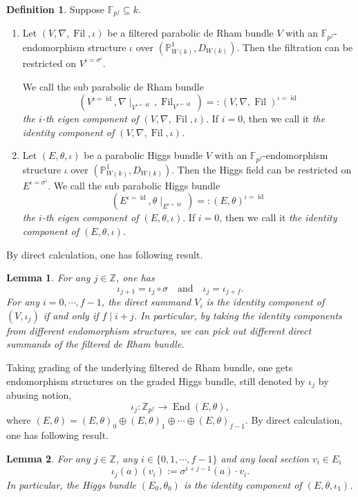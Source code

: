 \documentclass[12pt,twoside]{book}
\theoremstyle{plain}
\newtheorem{lemma}[lemma]{Lemma}
\theoremstyle{definition}
\newtheorem{definition}[definition]{Definition}
\theoremstyle{remark}
\newcommand{\bF}{{\mathbb F}}
\newcommand{\bP}{{\mathbb P}}
\newcommand{\bZ}{{\mathbb Z}}
\DeclareMathOperator\End{End}
\DeclareMathOperator\Fil{Fil}
\DeclareMathOperator\id{id}
\numberwithin{equation}{section}
\begin{document}
\begin{definition} Suppose $\bF_{p^f}\subseteq k$.
\begin{enumerate}
\item Let $(V,\nabla,\Fil,\iota)$ be a filtered parabolic de Rham bundle $V$ with an $\bF_{p^f}$-endomorphism structure $\iota$ over $(\bP^1_{W(k)},D_{W(k)})$. Then the filtration can be restricted on $V^{\iota=\sigma^i}$.

We call the sub parabolic de Rham bundle \[(V^{\iota=\id},\nabla\mid_{V^{\iota=\id}},\Fil_{V^{\iota=\id}}) =: (V,\nabla,\Fil)^{\iota=\id}\]
\emph{the $i$-th eigen component of $(V,\nabla,\Fil,\iota)$}. If $i=0$, then we call it \emph{the identity component of $(V,\nabla,\Fil,\iota)$.}
\item Let $(E,\theta,\iota)$ be a parabolic Higgs bundle $V$ with an $\bF_{p^f}$-endomorphism structure $\iota$ over $(\bP^1_{W(k)},D_{W(k)})$. Then the Higgs field can be restricted on $E^{\iota=\sigma^i}$.
We call the sub parabolic Higgs bundle \[(E^{\iota=\id},\theta\mid_{E^{\iota=\id}}) =: (E,\theta)^{\iota=\id}\]
\emph{the $i$-th eigen component of $(E,\theta,\iota)$}. If $i=0$, then we call it \emph{the identity component of $(E,\theta,\iota)$.}
\end{enumerate}

\end{definition}

By direct calculation, one has following result.
\begin{lemma} For any $j\in\bZ$, one has
\[\iota_{j+1} = \iota_j\circ\sigma \quad\text{and}\quad \iota_j=\iota_{j+f}.\]
For any $i=0,\cdots,f-1$, the direct summand $V_i$ is the identity component of $(V,\iota_j)$ if and only if $f\mid i+j$. In particular, by taking the identity components from different endomorphism structures, we can pick out different direct summands of the filtered de Rham bundle.
\end{lemma}

Taking grading of the underlying filtered de Rham bundle, one gets endomorphism structures on the graded Higgs bundle, still denoted by $\iota_j$ by abusing notion,
\[\iota_j\colon \bZ_{p^f} \rightarrow \End(E,\theta),\]
where $(E,\theta) = (E,\theta)_0 \oplus (E,\theta)_1 \oplus \cdots \oplus (E,\theta)_{f-1}$. By direct calculation, one has following result.
\begin{lemma} For any $j\in \bZ$, any $i\in\{0,1,\cdots,f-1\}$ and any local section $v_i\in E_i$
\[\iota_j(a)(v_i):=\sigma^{i+j-1}(a)\cdot v_i.\]
In particular, the Higgs bundle $(E_0,\theta_0)$ is the identity component of $(E,\theta,\iota_1)$.
\end{lemma}
\end{document}
